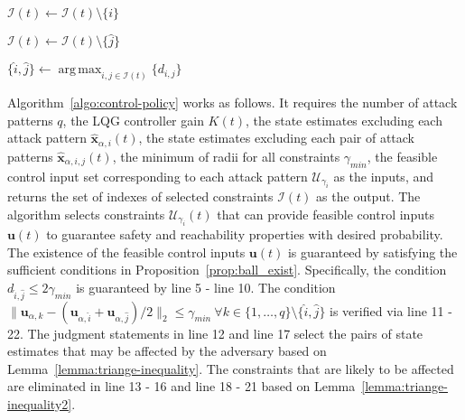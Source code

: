 \documentclass[journal]{IEEEtran}
\DeclareMathOperator*{\argmax}{arg\,max}
\begin{document}
\begin{algorithm}[h]
\begin{algorithmic}[1]
 		            \State $\mathcal{I}(t) \leftarrow \mathcal{I}(t) \setminus \{i\}$
 		        \EndIf
 		            
 		            \State $\mathcal{I}(t) \leftarrow \mathcal{I}(t) \setminus \{\hat{j}\}$
 		        \EndIf
 		    \EndIf
 		    
 		    \State $\{\hat{i}, \hat{j}\} \leftarrow \argmax_{i,j \in \mathcal{I}(t)} \{d_{i,j}\}$
 		\EndFor

        \State {}
        \EndProcedure
	 \end{algorithmic}
\end{algorithm}

Algorithm~\ref{algo:control-policy} works as follows. It requires the number of attack patterns $q$, the LQG controller gain $K(t)$, the state estimates excluding each attack pattern $\hat{\mathbf{x}}_{\alpha,i}(t)$, the state estimates excluding each pair of attack patterns $\hat{\mathbf{x}}_{\alpha,i,j}(t)$, the minimum of radii for all constraints $\gamma_{min}$, the feasible control input set corresponding to each attack pattern $\mathcal{U}_{\gamma_i}$ as the inputs, and returns the set of indexes of selected constraints $\mathcal{I}(t)$ as the output. The algorithm selects constraints $\mathcal{U}_{\gamma_i}(t)$ that can provide feasible control inputs $\mathbf{u}(t)$ to guarantee safety and reachability properties with desired probability. The existence of the feasible control inputs $\mathbf{u}(t)$ is guaranteed by satisfying the sufficient conditions in Proposition~\ref{prop:ball_exist}. Specifically, the condition $d_{\hat{i}, \hat{j}} \leq 2\gamma_{min}$ is guaranteed by line 5 - line 10. The condition $\|\mathbf{u}_{\alpha,k} - (\mathbf{u}_{\alpha,\hat{i}} + \mathbf{u}_{\alpha,\hat{j}})/2\|_2 \leq \gamma_{min} \ \forall k \in \{1,\ldots,q\} \setminus \{\hat{i}, \hat{j}\}$ is verified via line 11 - 22. The judgment statements in line 12 and line 17 select the pairs of state estimates that may be affected by the adversary based on Lemma~\ref{lemma:triange-inequality}. The constraints that are likely to be affected are eliminated in line 13 - 16 and line 18 - 21 based on Lemma~\ref{lemma:triange-inequality2}.
\end{document}
